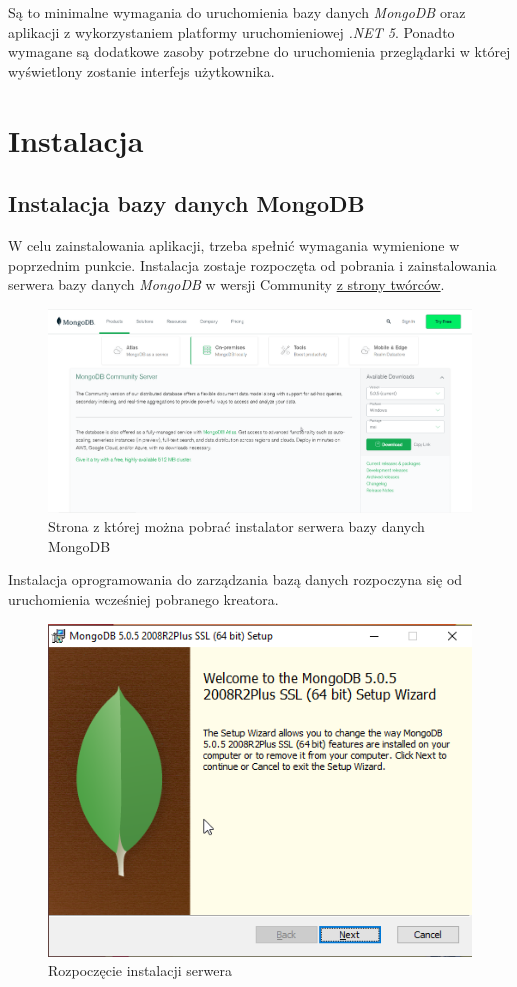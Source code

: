 \documentclass[a4paper,twoside,12pt]{book}
\begin{document}
Są to minimalne wymagania do uruchomienia bazy danych \textit{MongoDB} oraz aplikacji z wykorzystaniem platformy uruchomieniowej \textit{.NET 5}. Ponadto wymagane są dodatkowe zasoby potrzebne do uruchomienia przeglądarki w której wyświetlony zostanie interfejs użytkownika.

\section {Instalacja}

\subsection{Instalacja bazy danych MongoDB}
W celu zainstalowania aplikacji, trzeba spełnić wymagania wymienione w poprzednim punkcie. Instalacja zostaje rozpoczęta od pobrania i zainstalowania serwera bazy danych \textit{MongoDB} w wersji Community \href{https://www.mongodb.com/try/download/community}{z strony twórców}.
\FloatBarrier
\begin{figure}[H]
	\centering
	\includegraphics[width=0.75\linewidth]{../zrzuty_ekranu/instalcja_mongodb/mongodbsite}
	\caption{Strona z której można pobrać instalator serwera bazy danych MongoDB}
	\label{fig:mongodbsite}
\end{figure}
\afterpage{\clearpage}
\FloatBarrier

Instalacja oprogramowania do zarządzania bazą danych rozpoczyna się od uruchomienia wcześniej pobranego kreatora.
\FloatBarrier
\begin{figure}[H]
	\centering
	\includegraphics[width=0.5\linewidth]{../zrzuty_ekranu/instalcja_mongodb/mongodb1}
	\caption{Rozpoczęcie instalacji serwera}
	\label{fig:mongodb1}
\end{figure}
\afterpage{\clearpage}
\FloatBarrier
\end{document}
